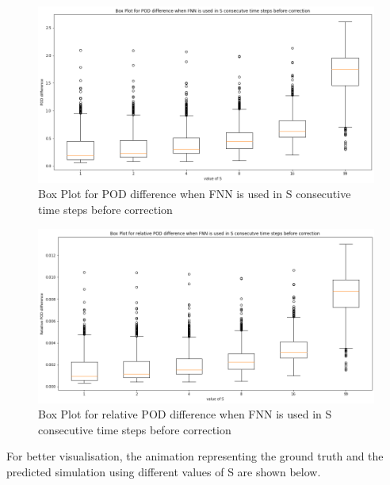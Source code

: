 \begin{figure}[H]
    \caption{Box Plot for POD difference when FNN is used in S consecutive time steps before correction}
    \includegraphics[scale=0.4]{figures/mantle_convection_images/further_testings/POD_boxplot.png}
\end{figure}

\begin{figure}[H]
    \caption{Box Plot for relative POD difference when FNN is used in S consecutive time steps before correction}
    \includegraphics[scale=0.4]{figures/mantle_convection_images/further_testings/Relative_POD_boxplot.png}
\end{figure}

For better visualisation, the animation representing the ground truth and the predicted simulation using different values of S are shown below.

